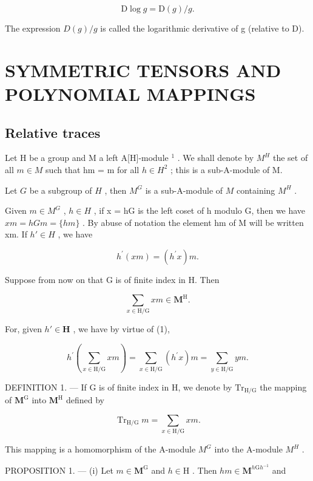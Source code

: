 \[
\mathrm{D} \log g = \mathrm{D} (g) / g.\tag{42}
\]

The expression \(D(g)/g\) is called the logarithmic derivative of g (relative to D).

\section{SYMMETRIC TENSORS AND POLYNOMIAL MAPPINGS}

\subsection{Relative traces}

Let H be a group and M a left A{[}H{]}-module \(^{1}\) . We shall denote by \(M^{H}\) the set of all \(m \in M\) such that hm = m for all \(h \in H^{2}\) ; this is a sub-A-module of M.

Let \(G\) be a subgroup of \(H\) , then \(M^G\) is a sub-A-module of \(M\) containing \(M^H\) .

Given \(m \in M^{G}\) , \(h \in H\) , if x = hG is the left coset of h modulo G, then we have \(xm = hGm = \{hm\}\) . By abuse of notation the element hm of M will be written xm. If \(h' \in H\) , we have

\[
h ^ {\prime} (x m) = \left(h ^ {\prime} x\right) m.\tag{1}
\]

Suppose from now on that G is of finite index in H. Then

\[
\sum_ {x \in \mathrm{H} / \mathrm{G}} x m \in \mathbf {M} ^ {\mathrm{H}}.\tag{2}
\]

For, given \(h' \in \mathbf{H}\) , we have by virtue of (1),

\[
h ^ {\prime} \left(\sum_ {x \in \mathrm{H} / \mathrm{G}} x m\right) = \sum_ {x \in \mathrm{H} / \mathrm{G}} \left(h ^ {\prime} x\right) m = \sum_ {y \in \mathrm{H} / \mathrm{G}} y m.
\]

DEFINITION 1. --- If G is of finite index in H, we denote by \(\mathrm{Tr}_{\mathrm{H}/\mathrm{G}}\) the mapping of \(\mathbf{M}^{\mathrm{G}}\) into \(\mathbf{M}^{\mathrm{H}}\) defined by

\[
\operatorname{Tr} _ {\mathrm{H} / \mathrm{G}} m = \sum_ {x \in \mathrm{H} / \mathrm{G}} x m.\tag{3}
\]

This mapping is a homomorphism of the A-module \(M^{G}\) into the A-module \(M^{H}\) .

PROPOSITION 1. --- (i) Let \(m \in \mathbf{M}^{\mathrm{G}}\) and \(h \in \mathrm{H}\) . Then \(hm \in \mathbf{M}^{h\mathrm{G}h^{-1}}\) and


